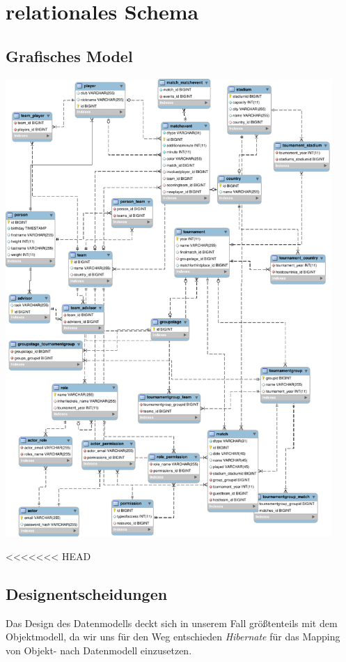 \documentclass[11pt,german]{scrartcl}
\begin{document}
\section*{relationales Schema}
\subsection*{Grafisches Model}
\begin{center}
\leavevmode
\includegraphics[width=0.93\textwidth]{../diagrams/relationales_schema.pdf}
\end{center}

<<<<<<< HEAD
\subsection*{Designentscheidungen}
Das Design des Datenmodells deckt sich in unserem Fall größtenteils mit dem Objektmodell, da wir uns für den Weg entschieden \emph{Hibernate} für das Mapping von Objekt- nach Datenmodell einzusetzen.
\end{document}
